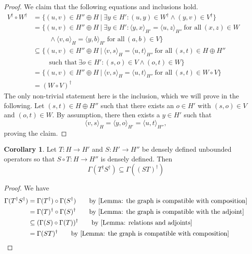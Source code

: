 \documentclass{article}
\numberwithin{equation}{section}
\theoremstyle{definition}
\newtheorem{corollary}[definition]{Corollary}
\theoremstyle{theorem}
\begin{document}
\begin{proof}
    We claim that the following equations and inclusions hold.
    \begin{align*}
            V^\dagger \circ W^\dagger 
            &= \{(u,v) \in H'' \oplus H \ | \ \exists y \in H': (u,y) \in W^\dagger \land (y,v) \in V^\dagger \} \\
            &= \{(u,v) \in H'' \oplus H \ | \ \exists y \in H': \langle y,x \rangle_{H'} = \langle u, z \rangle_{H''} \ \text{for all} \ (x,z) \in W \\
            &\hspace{1cm} \land \langle v,a \rangle_H = \langle y, b \rangle_{H'} \ \text{for all} \ (a,b) \in V\}\\
            &\subseteq \{(u,v) \in H'' \oplus H \ | \ \langle v,s \rangle_{H} = 
            \langle u,t \rangle_{H''} \ \text{for all}  \ (s,t) \in H \oplus H'' \\ 
            & \hspace{1cm} \text{such that} \ \exists o \in H': (s,o) \in V \land (o,t) \in W \} \\
            &= \{(u,v) \in H'' \oplus H \ | \ \langle v,s \rangle_{H} = 
            \langle u,t \rangle_{H''} \ \text{for all} \ (s,t) \in W \circ V \} \\
            &= (W \circ V)^{\dagger} &
    \end{align*}
    The only non-trivial statement here is the inclusion, which we will prove in the following. Let $(s,t) \in H \oplus H''$ such that there exists an $o \in H'$ 
    with $(s,o) \in V$ and $(o,t) \in W$. By assumption, there then exists a $y \in H'$ such that 
    \begin{equation}
        \langle v, s \rangle_H = \langle y, o \rangle_{H'} = \langle u,t \rangle_{H''},
    \end{equation}
    proving the claim.
\end{proof}
\begin{corollary}
    Let $T \colon H \to H'$ and $S \colon H' \to H''$ be densely defined unbounded operators so that $S \circ T \colon H \to H''$ is densely defined. Then
    \begin{equation}
        \Gamma(T^\dagger S^\dagger) \subseteq \Gamma((ST)^\dagger)
    \end{equation}
\end{corollary}
\begin{proof}
    We have 
    \begin{align*}
        \Gamma(T^\dagger S^\dagger) &= \Gamma(T^\dagger) \circ \Gamma(S^\dagger)  \tag*{\text{by \Cref{Lemma: the graph is compatible with composition}}} \\
        &= \Gamma(T)^\dagger \circ \Gamma(S)^\dagger \tag*{\text{by \Cref{Lemma: the graph is compatible with the adjoint}}} \\
        &\subseteq (\Gamma(S) \circ \Gamma(T))^\dagger \tag*{\text{by \Cref{Lemma: relations and adjoints}}} \\
        &= \Gamma(ST)^\dagger \tag*{\text{by \Cref{Lemma: the graph is compatible with composition}}}
    \end{align*}
\end{proof}
\end{document}
